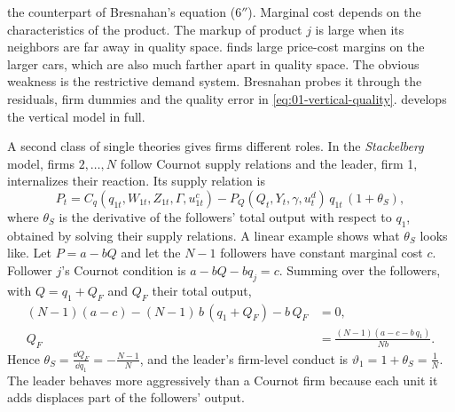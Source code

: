 the counterpart of Bresnahan's equation (6$''$). Marginal cost depends on the characteristics of the product. The
markup of product $j$ is large when its neighbors are far away in quality space. \citet{Bresnahan1981} finds large
price-cost margins on the larger cars, which are also much farther apart in quality space. The obvious weakness is the
restrictive demand system. Bresnahan probes it through the residuals, firm dummies and the quality error in
\eqref{eq:01-vertical-quality}.  develops the vertical model in full.

A second class of single theories gives firms different roles. In the \emph{Stackelberg} model, firms
$2, \dots, N$ follow Cournot supply relations and the leader, firm 1, internalizes their reaction. Its supply relation is
\begin{equation}\label{eq:01-stackelberg}
P_t = C_q(q_{1t}, W_{1t}, Z_{1t}, \Gamma, u^c_{1t}) - P_Q(Q_t, Y_t, \gamma, u^d_t)\,q_{1t}\,(1 + \theta_S),
\end{equation}
where $\theta_S$ is the derivative of the followers' total output with respect to $q_1$, obtained by solving their
supply relations. A linear example shows what $\theta_S$ looks like. Let $P = a - bQ$ and let the $N - 1$ followers
have constant marginal cost $c$. Follower $j$'s Cournot condition is $a - bQ - b q_j = c$. Summing over the followers,
with $Q = q_1 + Q_F$ and $Q_F$ their total output,
\begin{align*}
(N - 1)(a - c) - (N - 1)\,b\,(q_1 + Q_F) - b\,Q_F &= 0, \\
Q_F &= \frac{(N - 1)(a - c - b\,q_1)}{N b}.
\end{align*}
Hence $\theta_S = \frac{\dd Q_F}{\dd q_1} = -\frac{N - 1}{N}$, and the leader's firm-level conduct is
$\vartheta_1 = 1 + \theta_S = \frac{1}{N}$. The leader behaves more aggressively than a Cournot firm because each unit
it adds displaces part of the followers' output.

